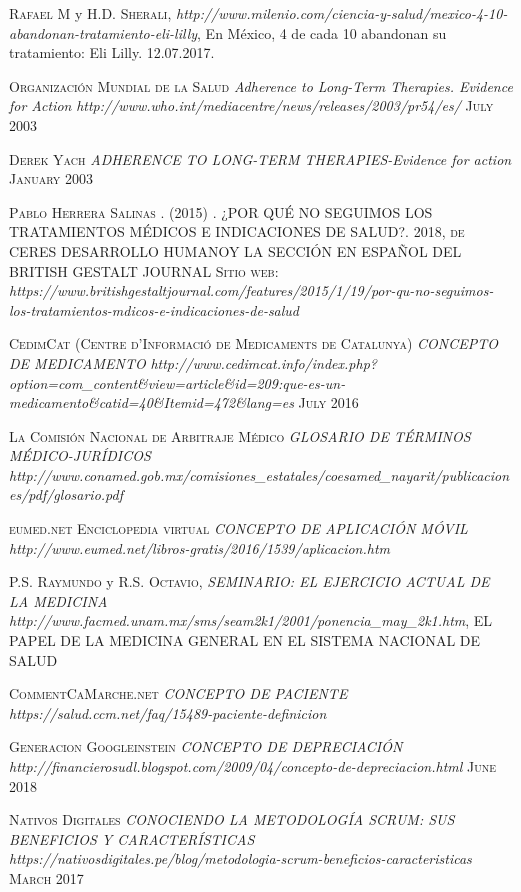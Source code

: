 \begin{thebibliography}{X}
	 \textsc{Rafael M} y \textsc{H.D. Sherali},
	\textit{http://www.milenio.com/ciencia-y-salud/mexico-4-10-abandonan-tratamiento-eli-lilly},  En México, 4 de cada 10 abandonan su tratamiento: Eli Lilly. 12.07.2017.
	
	 \textsc{Organización Mundial de la Salud} \textit{Adherence to Long-Term Therapies. Evidence for Action} \textit{http://www.who.int/mediacentre/news/releases/2003/pr54/es/} \textsc{July 2003}
	
	 \textsc{Derek Yach} \textit{ADHERENCE TO LONG-TERM THERAPIES-Evidence for action
} \textsc{January 2003}
	
	 \textsc{Pablo Herrera Salinas . (2015)} \textsc{. ¿POR QUÉ NO SEGUIMOS LOS TRATAMIENTOS MÉDICOS E INDICACIONES DE SALUD?. 2018, de CERES DESARROLLO HUMANOY LA SECCIÓN EN ESPAÑOL DEL BRITISH GESTALT JOURNAL Sitio web:} \textit{https://www.britishgestaltjournal.com/features/2015/1/19/por-qu-no-seguimos-los-tratamientos-mdicos-e-indicaciones-de-salud}
	
	 \textsc{CedimCat (Centre d'Informació de Medicaments de Catalunya)} \textit{CONCEPTO DE MEDICAMENTO} \textit{http://www.cedimcat.info/index.php?option=com\_content\&view=article\&id=209:que-es-un-medicamento\&catid=40\&Itemid=472\&lang=es} \textsc{July 2016}
	
	 \textsc{La Comisión Nacional de Arbitraje Médico} \textit{GLOSARIO DE TÉRMINOS MÉDICO-JURÍDICOS} \textit{http://www.conamed.gob.mx/comisiones\_estatales/coesamed\_nayarit/publicaciones/pdf/glosario.pdf}
	
	 \textsc{eumed.net Enciclopedia virtual} \textit{CONCEPTO DE APLICACIÓN MÓVIL} \textit{http://www.eumed.net/libros-gratis/2016/1539/aplicacion.htm}
	
	 \textsc{P.S. Raymundo} y \textsc{R.S. Octavio}, \textit{SEMINARIO: EL EJERCICIO ACTUAL DE LA MEDICINA}
	\textit{http://www.facmed.unam.mx/sms/seam2k1/2001/ponencia\_may\_2k1.htm}, EL PAPEL DE LA MEDICINA GENERAL EN EL SISTEMA NACIONAL DE SALUD
	
	 \textsc{CommentCaMarche.net} \textit{CONCEPTO DE PACIENTE} \textit{https://salud.ccm.net/faq/15489-paciente-definicion}
	
	 \textsc{Generacion Googleinstein} \textit{CONCEPTO DE DEPRECIACIÓN} \textit{http://financierosudl.blogspot.com/2009/04/concepto-de-depreciacion.html} \textsc{June 2018}
	
	 \textsc{Nativos Digitales} \textit{CONOCIENDO LA METODOLOGÍA SCRUM: SUS BENEFICIOS Y CARACTERÍSTICAS} \textit{https://nativosdigitales.pe/blog/metodologia-scrum-beneficios-caracteristicas} \textsc{March 2017}
	
\end{thebibliography}

